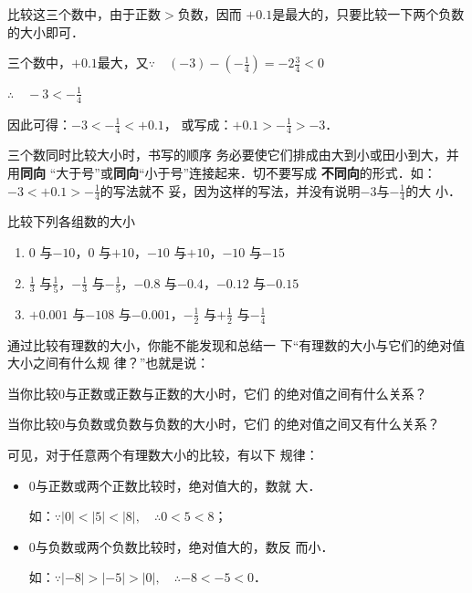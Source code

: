 \begin{analyze}
比较这三个数中，由于正数$>$负数，因而
$+0.1$是最大的，只要比较一下两个负数的大小即可．
\end{analyze}

\begin{solution}
    三个数中，$+0.1$最大，又$\because\quad (-3)-\left(-\frac{1}{4}\right)=-2\frac{3}{4}<0$

    $\therefore\quad -3<-\frac{1}{4}$

    因此可得：$-3<-\frac{1}{4}<+0.1$，
    或写成：$+0.1>-\frac{1}{4}>-3$．
\end{solution}

\begin{rmk}
三个数同时比较大小时，书写的顺序
务必要使它们排成由大到小或田小到大，并用\textbf{同向}
“大于号”或\textbf{同向}“小于号”连接起来．切不要写成
\textbf{不同向}的形式．如：$-3<+0.1>-\frac{1}{4}$的写法就不
妥，因为这样的写法，并没有说明$-3$与$-\frac{1}{4}$的大
小．
\end{rmk}

\begin{ex}
    比较下列各组数的大小
\begin{enumerate}
    \item $0$ 与$-10$，\quad $0$ 与$+10$，\quad $-10$ 与$+10$，\quad $-10$ 与$-15$
    \item $\frac{1}{3}$ 与$\frac{1}{5}$，\quad $-\frac{1}{3}$ 与$-\frac{1}{5}$，\quad $-0.8$ 与$-0.4$，\quad $-0.12$ 与$-0.15$
    \item $+0.001$ 与$-108$ 与$-0.001$，\quad $-\frac{1}{2}$ 与$+\frac{1}{2}$ 与$-\frac{1}{4}$
\end{enumerate}
\end{ex}

通过比较有理数的大小，你能不能发现和总结一
下“有理数的大小与它们的绝对值大小之间有什么规
律？”也就是说：

    当你比较0与正数或正数与正数的大小时，它们
的绝对值之间有什么关系？

    当你比较0与负数或负数与负数的大小时，它们
的绝对值之间又有什么关系？

    可见，对于任意两个有理数大小的比较，有以下
规律：
\begin{itemize}
    \item 0与正数或两个正数比较时，绝对值大的，数就
大．

如：$\because |0|<|5|<|8|, \quad \therefore 0<5<8$；
\item 0与负数或两个负数比较时，绝对值大的，数反
而小．

如：$\because |-8|>|-5|>|0|, \quad \therefore -8<-5<0$．
\end{itemize}
    
